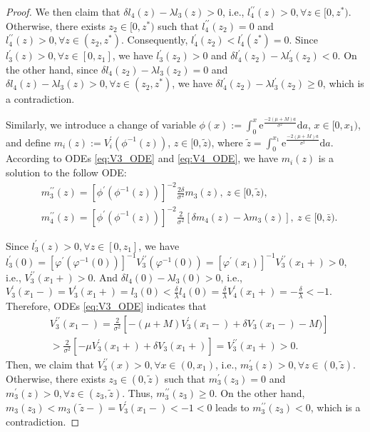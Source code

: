 \documentclass[11pt,reqno]{article}%
\numberwithin{equation}{section}
\begin{document}
\begin{proof}
We then claim that $\delta l_4(z)-\lambda l_3(z)>0$, i.e., $l_4^{\prime\prime}(z) > 0, \forall z\in[0,z^*)$. Otherwise, there exists $z_2\in[0,z^*)$ such that $l_4^{\prime\prime}(z_2)=0$ and $l_4^{\prime\prime}(z)>0, \forall z\in(z_2,z^*)$. Consequently, $l_4^{\prime}(z_2) < l_4^{\prime}(z^*) = 0$. Since $l_3^{\prime}(z)>0, \forall z\in [0,z_1]$, we have $l_3^{\prime}(z_2)>0$ and $\delta l_4^{\prime}(z_2)-\lambda l_3^{\prime}(z_2)<0$. On the other hand, since $\delta l_4(z_2)-\lambda l_3(z_2)=0$ and $\delta l_4(z)-\lambda l_3(z)>0, \forall z\in(z_2,z^*)$, we have $\delta l_4^{\prime}(z_2)-\lambda l_3^{\prime}(z_2)\ge 0$, which is a contradiction.

Similarly, we introduce a change of variable $\phi(x) := \int_{0}^x \mathrm{e}^{\frac{-2 (\mu+M) a}{\sigma^2}} \mathrm{d}a$, $x \in [0, x_1)$,
and define $m_i(z) := V_i^\prime(\phi^{-1}(z))$, $z\in[0,\tilde z)$, where $\tilde z = \int_{0}^{x_1} \mathrm{e}^{\frac{-2 (\mu+M) a}{\sigma^2}} \mathrm{d}a$. According to ODEs \eqref{eq:V3_ODE} and \eqref{eq:V4_ODE}, we have $m_i(z)$ is a solution to the follow ODE:
\begin{equation}\nonumber\begin{aligned}
 &m_3^{\prime\prime}(z) =\left[\phi^\prime(\phi^{-1}(z))\right]^{-2} \frac{2 \delta}{\sigma^2} m_3(z),\ z\in[0,\tilde z),\\
 &m_4^{\prime\prime}(z) =\left[\phi^\prime(\phi^{-1}(z))\right]^{-2} \frac{2 }{\sigma^2} \left[\delta m_4(z)-\lambda m_3(z)\right],\ z\in[0,\bar z).
\end{aligned}\end{equation}

Since $l_3^{\prime}(z)>0, \forall z\in [0,z_1]$, we have $l_3^{\prime}(0)=\left[\varphi^\prime(\varphi^{-1}(0))\right]^{-1}V_3^{\prime\prime}(\varphi^{-1}(0))=\left[\varphi^\prime(x_1)\right]^{-1}V_3^{\prime\prime}(x_1+)>0$,  i.e., $V_3^{\prime\prime}(x_1+)>0$. And $\delta l_4(0)-\lambda l_3(0)>0$, i.e., $V_3^{\prime}(x_1-)=V_3^{\prime}(x_1+)=l_3(0)<\frac{\delta}{\lambda}l_4(0)=\frac{\delta}{\lambda}V_4^{\prime}(x_1+)=-\frac{\delta}{\lambda}<-1$. Therefore, ODEs \eqref{eq:V3_ODE} indicates that
\begin{equation}\nonumber\begin{aligned}
&V^{\prime\prime}_3(x_1-) = \frac{2}{\sigma^2} \left[-(\mu+M) V_3^\prime(x_1-)+\delta V_3(x_1-) - M )\right]\\
&> \frac{2}{\sigma^2} \left[-\mu V_3^\prime(x_1+) + \delta V_3(x_1+)\right]= V_3^{\prime\prime}(x_1+) > 0.
\end{aligned}\end{equation}
Then, we claim that $V^{\prime\prime}_3(x)>0, \forall x\in(0,x_1)$, i.e., $m_3^\prime(z)>0,\forall z\in(0,\tilde z)$. Otherwise, there exists $z_3\in(0,\tilde z)$ such that $m_3^\prime(z_3)=0$ and $m_3^\prime(z)>0, \forall z\in(z_3,\tilde z)$. Thus, $m_3^{\prime\prime}(z_3)\ge 0$. On the other hand, $m_3(z_3)<m_3(\tilde z-)=V_3^\prime(x_1-)<-1<0$  leads to $m_3^{\prime\prime}(z_3)<0$, which is a contradiction.


\end{proof}
\end{document}
